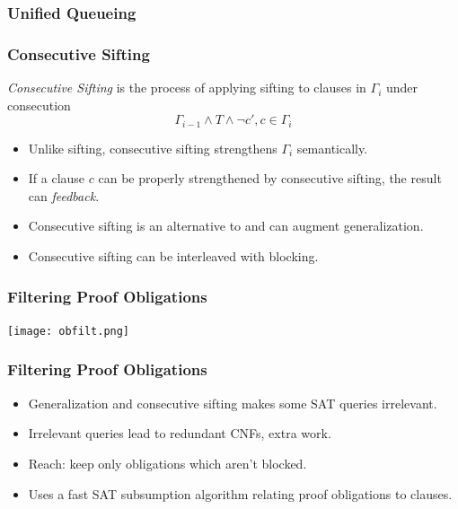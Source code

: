 \documentclass{beamer}
\begin{document}
\subsubsection{Unified Queueing}
\begin{frame}
	\frametitle{Consecutive Sifting}

	{\em Consecutive Sifting} is the process of applying sifting to clauses in $\Gamma_i$ under
	consecution
	\[ \Gamma_{i-1} \wedge T \wedge \neg c', c \in \Gamma_i\]

	\begin{itemize}
			\item Unlike sifting, consecutive sifting strengthens $\Gamma_i$ semantically.
			\item If a clause $c$ can be properly strengthened by consecutive sifting,
				the result can {\em feedback}.
			\item Consecutive sifting is an alternative to and can augment generalization.
			\item Consecutive sifting can be interleaved with blocking.
	\end{itemize}
\end{frame}

\begin{frame}
	\frametitle{Filtering Proof Obligations}
	\begin{center}
		\texttt{[image: obfilt.png]}
	\end{center}

\end{frame}

\begin{frame}
	\frametitle{Filtering Proof Obligations}
	\begin{itemize}
		\item Generalization and consecutive sifting makes some SAT queries irrelevant.
		\item Irrelevant queries lead to redundant CNFs, extra work.
		\item Reach: keep only obligations which aren't blocked.
		\item Uses a fast SAT subsumption algorithm relating proof obligations to
			clauses.
	\end{itemize}
\end{frame}
\end{document}
